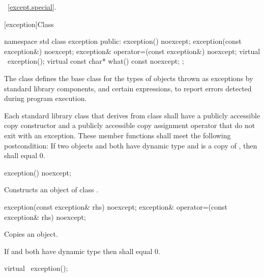 \xref~\ref{except.special}.

[exception]{Class }

%
\begin{codeblock}
namespace std {
  class exception {
  public:
    exception() noexcept;
    exception(const exception&) noexcept;
    exception& operator=(const exception&) noexcept;
    virtual ~exception();
    virtual const char* what() const noexcept;
  };
}
\end{codeblock}

\pnum
The class
defines the base
class for the types of objects thrown as exceptions by
\Cpp standard library components, and certain
expressions, to report errors detected during program execution.

\pnum
Each standard library class  that derives from class  shall have a
publicly accessible copy constructor and a publicly accessible copy assignment
operator that do not exit with an exception. These member functions shall meet
the following postcondition: If two objects  and  both have
dynamic type  and  is a copy of , then
 shall equal 0.

%
\begin{itemdecl}
exception() noexcept;
\end{itemdecl}

\begin{itemdescr}
\pnum
\effects
Constructs an object of class
.
\end{itemdescr}

%
%
\begin{itemdecl}
exception(const exception& rhs) noexcept;
exception& operator=(const exception& rhs) noexcept;
\end{itemdecl}

\begin{itemdescr}
\pnum
\effects
Copies an
object.

\pnum
\postcondition If  and  both have dynamic type 
then  shall equal 0.
\end{itemdescr}

%
\begin{itemdecl}
virtual ~exception();
\end{itemdecl}

